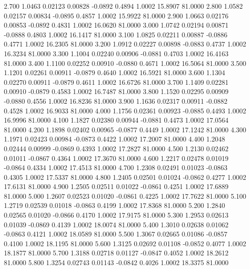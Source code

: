    2.700   1.0463   0.02123   0.00828  -0.0892   0.4894   1.0002  15.8907  81.0000
   2.800   1.0582   0.02157   0.00834  -0.0895   0.4857   1.0002  15.9922  81.0000
   2.900   1.0663   0.02176   0.00853  -0.0892   0.4831   1.0002  16.0620  81.0000
   3.000   1.0742   0.02194   0.00871  -0.0888   0.4803   1.0002  16.1417  81.0000
   3.100   1.0825   0.02211   0.00887  -0.0886   0.4771   1.0002  16.2305  81.0000
   3.200   1.0912   0.02227   0.00898  -0.0883   0.4737   1.0002  16.3234  81.0000
   3.300   1.1004   0.02240   0.00906  -0.0881   0.4703   1.0002  16.4163  81.0000
   3.400   1.1100   0.02252   0.00910  -0.0880   0.4671   1.0002  16.5064  81.0000
   3.500   1.1201   0.02261   0.00911  -0.0879   0.4640   1.0002  16.5921  81.0000
   3.600   1.1304   0.02270   0.00911  -0.0879   0.4611   1.0002  16.6726  81.0000
   3.700   1.1409   0.02281   0.00910  -0.0879   0.4583   1.0002  16.7487  81.0000
   3.800   1.1520   0.02295   0.00909  -0.0880   0.4556   1.0002  16.8236  81.0000
   3.900   1.1636   0.02317   0.00911  -0.0882   0.4528   1.0002  16.9033  81.0000
   4.000   1.1756   0.02361   0.00923  -0.0885   0.4493   1.0002  16.9996  81.0000
   4.100   1.1827   0.02380   0.00944  -0.0881   0.4473   1.0002  17.0564  81.0000
   4.200   1.1898   0.02402   0.00965  -0.0877   0.4449   1.0002  17.1242  81.0000
   4.300   1.1971   0.02423   0.00984  -0.0873   0.4422   1.0002  17.2007  81.0000
   4.400   1.2048   0.02444   0.00999  -0.0869   0.4393   1.0002  17.2827  81.0000
   4.500   1.2130   0.02462   0.01011  -0.0867   0.4364   1.0002  17.3670  81.0000
   4.600   1.2217   0.02478   0.01019  -0.0864   0.4334   1.0002  17.4513  81.0000
   4.700   1.2308   0.02491   0.01023  -0.0863   0.4305   1.0002  17.5337  81.0000
   4.800   1.2405   0.02501   0.01024  -0.0862   0.4277   1.0002  17.6131  81.0000
   4.900   1.2505   0.02511   0.01022  -0.0861   0.4251   1.0002  17.6889  81.0000
   5.000   1.2607   0.02523   0.01020  -0.0861   0.4225   1.0002  17.7622  81.0000
   5.100   1.2719   0.02539   0.01018  -0.0863   0.4199   1.0002  17.8368  81.0000
   5.200   1.2840   0.02565   0.01020  -0.0866   0.4170   1.0002  17.9175  81.0000
   5.300   1.2953   0.02613   0.01039  -0.0869   0.4139   1.0002  18.0074  81.0000
   5.400   1.3010   0.02638   0.01062  -0.0863   0.4121   1.0002  18.0589  81.0000
   5.500   1.3067   0.02665   0.01086  -0.0857   0.4100   1.0002  18.1195  81.0000
   5.600   1.3125   0.02692   0.01108  -0.0852   0.4077   1.0002  18.1877  81.0000
   5.700   1.3188   0.02718   0.01127  -0.0847   0.4052   1.0002  18.2612  81.0000
   5.800   1.3254   0.02743   0.01143  -0.0842   0.4026   1.0002  18.3375  81.0000

